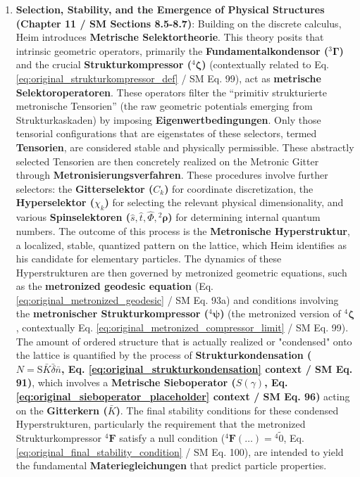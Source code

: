 \documentclass[12pt]{article}
\newcommand{\q}[1]{\enquote{#1}}
\newcommand{\fundamentalkondensor}{{}^3\bm{\Gamma}}
\newcommand{\metrischesieboperator}{S(\gamma)}
\newcommand{\strukturkompressor}{{}^4\bm{\zeta}}
\newcommand{\metronischerstrukturkompressor}{{}^4\bm{\psi}}
\newcommand{\metronisiertekondensor}[1]{{}^{#1}\mathbf{F}}
\begin{document}
\begin{enumerate}
    \item \textbf{Selection, Stability, and the Emergence of Physical Structures (Chapter 11 / SM Sections 8.5-8.7)}: Building on the discrete calculus, Heim introduces \textbf{Metrische Selektortheorie}. This theory posits that intrinsic geometric operators, primarily the \textbf{Fundamentalkondensor (\( \fundamentalkondensor \))} and the crucial \textbf{Strukturkompressor (\( \strukturkompressor \))} (contextually related to Eq. \eqref{eq:original_strukturkompressor_def} / SM Eq. 99), act as \textbf{metrische Selektoroperatoren}. These operators filter the \q{primitiv strukturierte metronische Tensorien} (the raw geometric potentials emerging from Strukturkaskaden) by imposing \textbf{Eigenwertbedingungen}. Only those tensorial configurations that are eigenstates of these selectors, termed \textbf{Tensorien}, are considered stable and physically permissible. These abstractly selected Tensorien are then concretely realized on the Metronic Gitter through \textbf{Metronisierungsverfahren}. These procedures involve further selectors: the \textbf{Gitterselektor (\( C_k \))} for coordinate discretization, the \textbf{Hyperselektor (\( \chi_k \))} for selecting the relevant physical dimensionality, and various \textbf{Spinselektoren (\( \hat{s}, \hat{t}, \hat{\Phi}, {}^2\bm{\rho} \))} for determining internal quantum numbers. The outcome of this process is the \textbf{Metronische Hyperstruktur}, a localized, stable, quantized pattern on the lattice, which Heim identifies as his candidate for elementary particles. The dynamics of these Hyperstrukturen are then governed by metronized geometric equations, such as the \textbf{metronized geodesic equation} (Eq. \eqref{eq:original_metronized_geodesic} / SM Eq. 93a) and conditions involving the \textbf{metronischer Strukturkompressor (\( \metronischerstrukturkompressor \))} (the metronized version of \( \strukturkompressor \), contextually Eq. \eqref{eq:original_metronized_compressor_limit} / SM Eq. 99). The amount of ordered structure that is actually realized or "condensed" onto the lattice is quantified by the process of \textbf{Strukturkondensation (\( N = \mathrm{S}\bar{K}\bar{\delta}\bar{n} \), Eq. \eqref{eq:original_strukturkondensation} context / SM Eq. 91)}, which involves a \textbf{Metrische Sieboperator (\( \metrischesieboperator \), Eq. \eqref{eq:original_sieboperator_placeholder} context / SM Eq. 96)} acting on the \textbf{Gitterkern (\( \bar{K} \))}. The final stability conditions for these condensed Hyperstrukturen, particularly the requirement that the metronized Strukturkompressor \( \metronisiertekondensor{4} \) satisfy a null condition (\( \metronisiertekondensor{4}(\dots) = {}^{4}\tilde{0} \), Eq. \eqref{eq:original_final_stability_condition} / SM Eq. 100), are intended to yield the fundamental \textbf{Materiegleichungen} that predict particle properties.


\end{enumerate}
\end{document}

